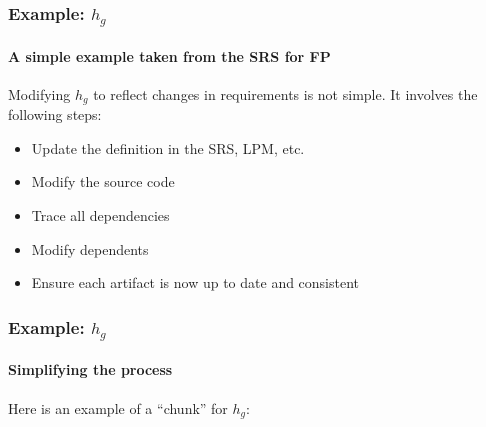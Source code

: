 \documentclass{beamer}
\begin{document}

%
%
%


\begin{frame}

\frametitle{Example: $h_g$}

\framesubtitle{A simple example taken from the SRS for FP}

Modifying $h_g$ to reflect changes in requirements is not %
simple.
It involves
the following steps:
\begin{itemize}
\item Update the definition in the SRS, LPM, etc.
\item Modify the source code %
\item Trace all dependencies
\item Modify dependents %
\item Ensure each artifact is now up to date and consistent
\end{itemize}

\end{frame}


\begin{frame}

\frametitle{Example: $h_g$}

\framesubtitle{Simplifying the process}

Here is an example of a ``chunk'' for $h_g$:



\end{frame}

\end{document}
